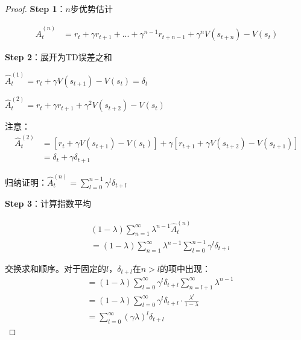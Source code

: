 \documentclass[11pt,a4paper]{article}
\theoremstyle{definition}
\begin{document}
\begin{proof}
\textbf{Step 1}：$n$步优势估计

\begin{align*}
\hat{A}^{(n)}_t &= r_t + \gamma r_{t+1} + ... + \gamma^{n-1} r_{t+n-1} + \gamma^n V(s_{t+n}) - V(s_t)
\end{align*}

\textbf{Step 2}：展开为TD误差之和

$\hat{A}^{(1)}_t = r_t + \gamma V(s_{t+1}) - V(s_t) = \delta_t$

$\hat{A}^{(2)}_t = r_t + \gamma r_{t+1} + \gamma^2 V(s_{t+2}) - V(s_t)$

注意：
\begin{align*}
\hat{A}^{(2)}_t &= [r_t + \gamma V(s_{t+1}) - V(s_t)] + \gamma[r_{t+1} + \gamma V(s_{t+2}) - V(s_{t+1})] \\
&= \delta_t + \gamma \delta_{t+1}
\end{align*}

归纳证明：$\hat{A}^{(n)}_t = \sum_{l=0}^{n-1} \gamma^l \delta_{t+l}$

\textbf{Step 3}：计算指数平均

\begin{align*}
&(1-\lambda) \sum_{n=1}^\infty \lambda^{n-1} \hat{A}^{(n)}_t \\
&= (1-\lambda) \sum_{n=1}^\infty \lambda^{n-1} \sum_{l=0}^{n-1} \gamma^l \delta_{t+l}
\end{align*}

交换求和顺序。对于固定的$l$，$\delta_{t+l}$在$n > l$的项中出现：
\begin{align*}
&= (1-\lambda) \sum_{l=0}^\infty \gamma^l \delta_{t+l} \sum_{n=l+1}^\infty \lambda^{n-1} \\
&= (1-\lambda) \sum_{l=0}^\infty \gamma^l \delta_{t+l} \cdot \frac{\lambda^l}{1-\lambda} \\
&= \sum_{l=0}^\infty (\gamma\lambda)^l \delta_{t+l}
\end{align*}
\end{proof}
\end{document}
